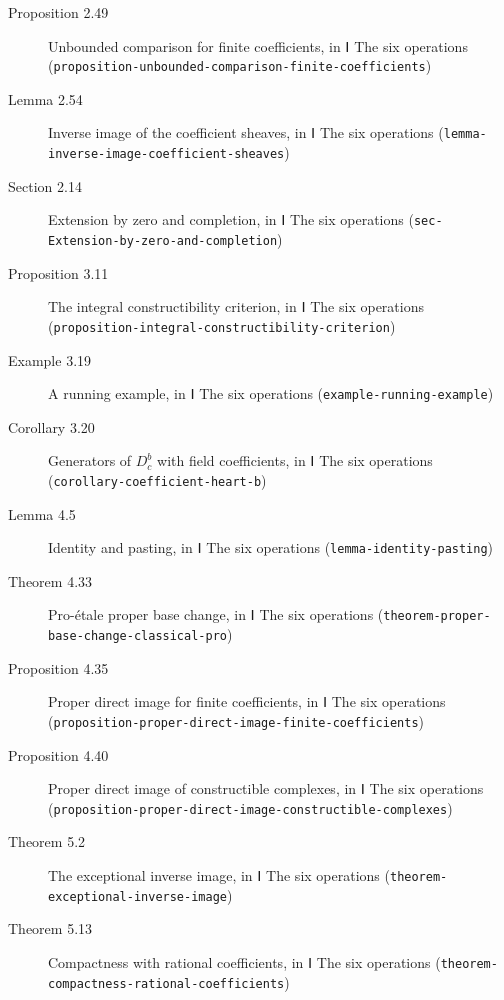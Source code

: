 \documentclass[11pt]{article}
\newcommand{\bpslug}[1]{\texttt{#1}}
\begin{document}
\begin{description}
\item[Proposition 2.49] Unbounded comparison for finite coefficients, in Ⅰ The six operations (\bpslug{proposition-{}\allowbreak{}unbounded-{}\allowbreak{}comparison-{}\allowbreak{}finite-{}\allowbreak{}coefficients})
\item[Lemma 2.54] Inverse image of the coefficient sheaves, in Ⅰ The six operations (\bpslug{lemma-{}\allowbreak{}inverse-{}\allowbreak{}image-{}\allowbreak{}coefficient-{}\allowbreak{}sheaves})
\item[Section 2.14] Extension by zero and completion, in Ⅰ The six operations (\bpslug{sec-{}\allowbreak{}Extension-{}\allowbreak{}by-{}\allowbreak{}zero-{}\allowbreak{}and-{}\allowbreak{}completion})
\item[Proposition 3.11] The integral constructibility criterion, in Ⅰ The six operations (\bpslug{proposition-{}\allowbreak{}integral-{}\allowbreak{}constructibility-{}\allowbreak{}criterion})
\item[Example 3.19] A running example, in Ⅰ The six operations (\bpslug{example-{}\allowbreak{}running-{}\allowbreak{}example})
\item[Corollary 3.20] Generators of $D^b_c$ with field coefficients, in Ⅰ The six operations (\bpslug{corollary-{}\allowbreak{}coefficient-{}\allowbreak{}heart-{}\allowbreak{}b})
\item[Lemma 4.5] Identity and pasting, in Ⅰ The six operations (\bpslug{lemma-{}\allowbreak{}identity-{}\allowbreak{}pasting})
\item[Theorem 4.33] Pro-étale proper base change, in Ⅰ The six operations (\bpslug{theorem-{}\allowbreak{}proper-{}\allowbreak{}base-{}\allowbreak{}change-{}\allowbreak{}classical-{}\allowbreak{}pro})
\item[Proposition 4.35] Proper direct image for finite coefficients, in Ⅰ The six operations (\bpslug{proposition-{}\allowbreak{}proper-{}\allowbreak{}direct-{}\allowbreak{}image-{}\allowbreak{}finite-{}\allowbreak{}coefficients})
\item[Proposition 4.40] Proper direct image of constructible complexes, in Ⅰ The six operations (\bpslug{proposition-{}\allowbreak{}proper-{}\allowbreak{}direct-{}\allowbreak{}image-{}\allowbreak{}constructible-{}\allowbreak{}complexes})
\item[Theorem 5.2] The exceptional inverse image, in Ⅰ The six operations (\bpslug{theorem-{}\allowbreak{}exceptional-{}\allowbreak{}inverse-{}\allowbreak{}image})
\item[Theorem 5.13] Compactness with rational coefficients, in Ⅰ The six operations (\bpslug{theorem-{}\allowbreak{}compactness-{}\allowbreak{}rational-{}\allowbreak{}coefficients})

\end{description}
\end{document}
